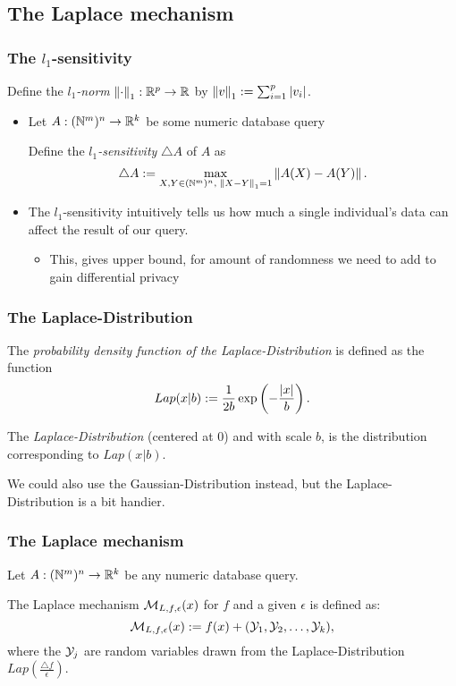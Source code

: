 \documentclass[xcolor=dvipsnames]{beamer}
\newcommand{\itm}{\pause\item}
\begin{document}
    \subsection{The Laplace mechanism}
      \begin{frame} %
      	\frametitle{The $l_1$-sensitivity}
      	\pause \begin{defn}[$l_1$-norm]
      	  \label{defn:l1-norm}
      	  Define the \emph{$l_1$-norm} $\left\|\cdot\right\|_1:\mathbb{R}^p\to\mathbb{R}$ by $\left\|v\right\|_1:=\sum_{i=1}^{p}\left\lvert v_{i}\right\rvert$.
      	\end{defn}
      	\begin{itemize}
      	  \itm Let $A:(\mathbb{N}^m)^n\to\mathbb{R}^k$ be some numeric database query 
      	  \pause \begin{defn}[$l_1$-sensitivity]
      	  	\label{defn:l1-sensitivity}
      	  	Define the \emph{$l_1$-sensitivity} $\triangle A$ of $A$ as \pause$$\triangle A:=\max_{X,Y\in(\mathbb{N}^m)^n,\; \left\|X-Y\right\|_1=1}\left\|A(X)-A(Y)\right\|.$$
      	  \end{defn}
      	  \itm The $l_1$-sensitivity intuitively tells us how much a single individual's data can affect the result of our query.
      	  \begin{itemize}
      	    \itm[$\hookrightarrow$] This, gives upper bound, for amount of randomness we need to add to gain differential privacy
      	  \end{itemize}
      	\end{itemize}
      \end{frame}
      \begin{frame} %
      	\frametitle{The Laplace-Distribution}
      	\pause \begin{defn}
      	  The \emph{probability density function of the Laplace-Distribution} is defined as the function $$Lap(x|b):=\frac{1}{2b}\exp\left(-\frac{\left\lvert x\right\rvert}{b}\right).$$
      	\end{defn}
      	\pause \begin{defn}
      	  \label{defn:Lap}
      	  The \emph{Laplace-Distribution} (centered at 0) and with scale $b$, is the distribution corresponding to $Lap(x|b)$.
      	\end{defn}
      	\pause \begin{rem}
      	  We could also use the Gaussian-Distribution instead, but the Laplace-Distribution is a bit handier.
      	\end{rem}
      \end{frame}
      \begin{frame} %
      	\frametitle{The Laplace mechanism}
      	\pause Let $A:(\mathbb{N}^m)^n\to\mathbb{R}^k$ be any numeric database query.
      	\pause \begin{defn}
      	  \label{defn:Lap-mechanism}
      	  The Laplace mechanism $\mathcal{M}_{L,f,\epsilon}(x)$ for $f$ and a given $\epsilon$ is defined as:
      	  $$\mathcal{M}_{L,f,\epsilon}(x):=f(x)+(\mathcal{Y}_1,\mathcal{Y}_2,\ldots,\mathcal{Y}_k),$$
      	  where the $\mathcal{Y}_j$ are random variables drawn from the Laplace-Distribution $Lap(\frac{\triangle f}{\epsilon})$.
      	\end{defn}
      \end{frame}  
\end{document}
